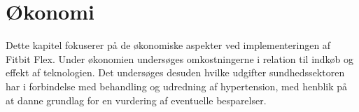 \chapter{Økonomi}
Dette kapitel fokuserer på de økonomiske aspekter ved implementeringen af Fitbit Flex. Under økonomien undersøges omkostningerne i relation til indkøb og effekt af teknologien. Det undersøges desuden hvilke udgifter sundhedssektoren har i forbindelse med behandling og udredning af hypertension, med henblik på at danne grundlag for en vurdering af eventuelle besparelser. 
